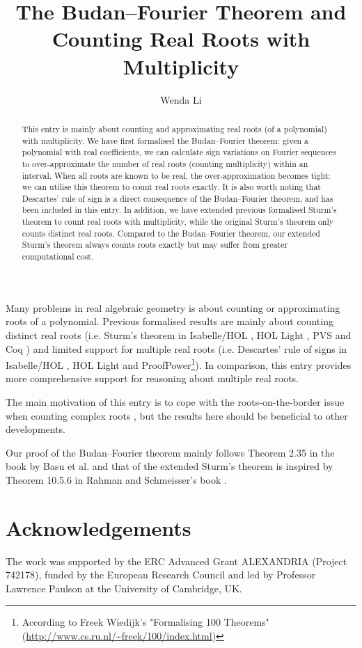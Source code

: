 \documentclass[11pt,a4paper]{article}
\begin{document}
\title{The Budan--Fourier Theorem and Counting Real Roots with Multiplicity}
\author{Wenda Li}
\maketitle

\begin{abstract}
	This entry is mainly about counting and approximating real roots (of a polynomial) with multiplicity.
	We have first formalised the Budan--Fourier theorem: given a polynomial with real coefficients, we can calculate sign variations on Fourier sequences to over-approximate the number of real roots (counting multiplicity) within an interval. When all roots are known to be real, the over-approximation becomes tight: we can utilise this theorem to count real roots exactly. It is also worth noting that Descartes' rule of sign is a direct consequence of the Budan--Fourier theorem, and has been included in this entry. In addition, we have extended previous formalised Sturm's theorem to count real roots with multiplicity, while the original Sturm's theorem only counts distinct real roots. Compared to the Budan--Fourier theorem, our extended Sturm's theorem always counts roots exactly but may suffer from greater computational cost.
\end{abstract}

Many problems in real algebraic geometry is about counting or approximating roots of a polynomial. Previous formalised results are mainly about counting distinct real roots (i.e. Sturm's theorem in Isabelle/HOL \cite{Sturm_Tarski-AFP,Sturm_Sequences-AFP}, HOL Light \cite{harrison-poly}, PVS \cite{Narkawicz:2015do} and Coq \cite{Mahboubi:2012gg}) and limited support for multiple real roots (i.e. Descartes' rule of signs in Isabelle/HOL \cite{Descartes_Sign_Rule-AFP}, HOL Light and ProofPower\footnote{According to Freek Wiedijk's "Formalising 100 Theorems" (\url{http://www.cs.ru.nl/~freek/100/index.html})}). In comparison, this entry provides more comprehensive support for reasoning about multiple real roots.

The main motivation of this entry is to cope with the roots-on-the-border issue when counting complex roots \cite{li_evaluate_cauchy,Count_Complex_Roots-AFP}, but the results here should be beneficial to other developments.

Our proof of the Budan--Fourier theorem mainly follows Theorem 2.35 in the book by Basu et al. \cite{Basu:2006bo} and that of the extended Sturm's theorem is inspired by Theorem 10.5.6 in Rahman and Schmeisser's book \cite{Rahman:2016us}.




\section{Acknowledgements}
The work was supported by the ERC Advanced Grant ALEXANDRIA (Project 742178), funded by the European Research Council
and led by Professor Lawrence Paulson at the University of Cambridge, UK.



\end{document}
